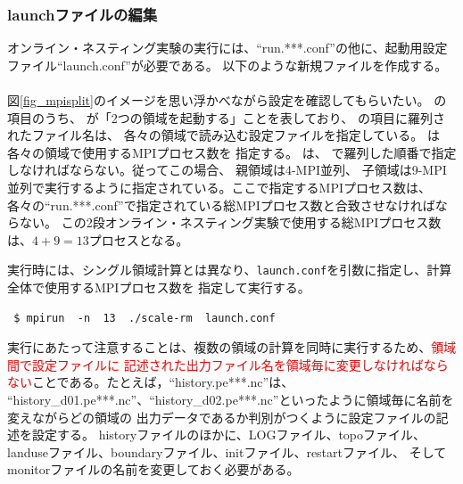 

\subsubsection{launchファイルの編集}
オンライン・ネスティング実験の実行には、``run.***.conf''の他に、起動用設定ファイル``launch.conf''が必要である。
以下のような新規ファイルを作成する。\\

\\

\noindent 図\ref{fig_mpisplit}のイメージを思い浮かべながら設定を確認してもらいたい。
の項目のうち、
が「2つの領域を起動する」ことを表しており、
の項目に羅列されたファイル名は、
各々の領域で読み込む設定ファイルを指定している。
は各々の領域で使用するMPIプロセス数を
指定する。
は、
で羅列した順番で指定しなければならない。従ってこの場合、
親領域は4-MPI並列、
子領域は9-MPI並列で実行するように指定されている。ここで指定するMPIプロセス数は、
各々の``run.***.conf''で指定されている総MPIプロセス数と合致させなければならない。
この2段オンライン・ネスティング実験で使用する総MPIプロセス数は、$4 + 9 = 13$プロセスとなる。

実行時には、シングル領域計算とは異なり、\verb|launch.conf|を引数に指定し、計算全体で使用するMPIプロセス数を
指定して実行する。
\begin{verbatim}
 $ mpirun  -n  13  ./scale-rm  launch.conf
\end{verbatim}

実行にあたって注意することは、複数の領域の計算を同時に実行するため、\textcolor{red}{領域間で設定ファイルに
記述された出力ファイル名を領域毎に変更しなければならない}ことである。たとえば，``history.pe***.nc''は、
``history\_d01.pe***.nc''、``history\_d02.pe***.nc''といったように領域毎に名前を変えながらどの領域の
出力データであるか判別がつくように設定ファイルの記述を設定する。
historyファイルのほかに、LOGファイル、topoファイル、landuseファイル、boundaryファイル、initファイル、restartファイル、
そしてmonitorファイルの名前を変更しておく必要がある。

